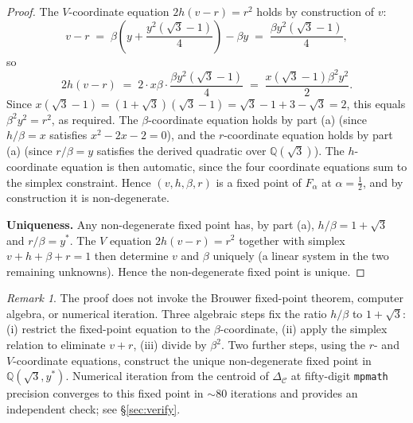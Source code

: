 \documentclass[11pt,reqno]{amsart}
\theoremstyle{plain}
\theoremstyle{definition}
\theoremstyle{remark}
\newtheorem*{remark}{Remark}
\newcommand{\Q}{\mathbb{Q}}
\newcommand{\Cfour}{\mathcal{C}}
\newcommand{\Fmix}{F_{\alpha}}
\begin{document}
\begin{proof}
The $V$-coordinate equation $2h(v-r)=r^{2}$ holds by construction
of $v$:
\[
v-r\;=\;\beta\!\left(y+\frac{y^{2}(\sqrt{3}-1)}{4}\right)-\beta y\;=\;\frac{\beta y^{2}(\sqrt{3}-1)}{4},
\]
so
\[
2h(v-r)\;=\;2\cdot x\beta\cdot\frac{\beta y^{2}(\sqrt{3}-1)}{4}\;=\;\frac{x(\sqrt{3}-1)\beta^{2}y^{2}}{2}.
\]
Since $x(\sqrt{3}-1)=(1+\sqrt{3})(\sqrt{3}-1)=\sqrt{3}-1+3-\sqrt{3}=2$,
this equals $\beta^{2}y^{2}=r^{2}$, as required. The
$\beta$-coordinate equation holds by part (a) (since $h/\beta=x$
satisfies $x^{2}-2x-2=0$), and the $r$-coordinate equation holds
by part (a) (since $r/\beta=y$ satisfies the derived quadratic
over $\Q(\sqrt{3})$). The $h$-coordinate equation is then
automatic, since the four coordinate equations sum to the simplex
constraint. Hence
$(v,h,\beta,r)$ is a fixed point of $\Fmix$ at $\alpha=\tfrac12$,
and by construction it is non-degenerate.

\textbf{Uniqueness.} Any non-degenerate fixed point has, by
part (a), $h/\beta=1+\sqrt{3}$ and $r/\beta=y^{*}$. The $V$
equation $2h(v-r)=r^{2}$ together with simplex $v+h+\beta+r=1$
then determine $v$ and $\beta$ uniquely (a linear system in the
two remaining unknowns). Hence the non-degenerate fixed point is
unique.
\end{proof}

\begin{remark}
The proof does not invoke the Brouwer fixed-point theorem,
computer algebra, or numerical iteration. Three algebraic steps
fix the ratio $h/\beta$ to $1+\sqrt{3}$: (i) restrict the
fixed-point equation to the $\beta$-coordinate, (ii) apply the
simplex relation to eliminate $v+r$, (iii) divide by $\beta^{2}$.
Two further steps, using the $r$- and $V$-coordinate equations,
construct the unique non-degenerate fixed point in
$\Q(\sqrt{3},y^{*})$. Numerical iteration from the centroid of
$\Delta_{\Cfour}$ at fifty-digit \texttt{mpmath} precision
converges to this fixed point in $\sim 80$ iterations and
provides an independent check; see \S\ref{sec:verify}.
\end{remark}
\end{document}
